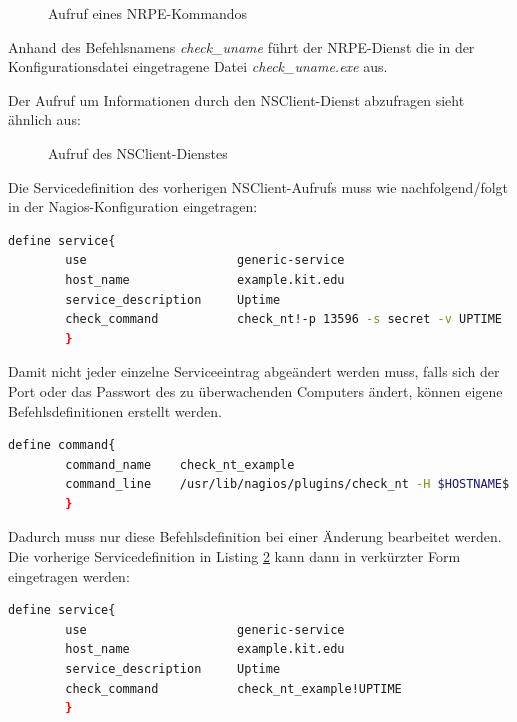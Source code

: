 \begin{figure}[ht]
	\centering
		\caption{Aufruf eines NRPE-Kommandos}
		\label{nrpecheck}
\end{figure}



Anhand des Befehlsnamens \textit{check\_uname} führt der \gls{NRPE}-Dienst die in der Konfigurationsdatei eingetragene Datei \textit{check\_uname.exe} aus.

Der Aufruf um Informationen durch den NSClient-Dienst abzufragen sieht ähnlich aus:

\begin{figure}[ht]
	\centering
		\caption{Aufruf des NSClient-Dienstes}
		\label{ntcheck}
\end{figure}

Die Servicedefinition des vorherigen NSClient-Aufrufs muss wie nachfolgend/folgt in der Nagios-Konfiguration eingetragen:
\begin{lstlisting}[captionpos=b, caption=Servicedefinition des NSClient-Checks, label=nt-servdef, breaklines = true, language=sh]
define service{
        use                     generic-service
        host_name               example.kit.edu
        service_description     Uptime
        check_command           check_nt!-p 13596 -s secret -v UPTIME
        }
\end{lstlisting}

Damit nicht jeder einzelne Serviceeintrag abgeändert werden muss, falls sich der Port oder das Passwort des zu überwachenden Computers ändert, können eigene Befehlsdefinitionen erstellt werden.

\begin{lstlisting}[captionpos=b, caption=Server spezifische Befehlsdefinition, label=cus-nt-servdef, breaklines = true, language=sh]        
define command{
        command_name    check_nt_example
        command_line    /usr/lib/nagios/plugins/check_nt -H $HOSTNAME$ -p 13597 -p secret -v $ARG1$
        }
\end{lstlisting}

Dadurch muss nur diese Befehlsdefinition bei einer Änderung bearbeitet werden.
Die vorherige Servicedefinition in Listing \ref{ntcheck} kann dann in verkürzter Form eingetragen werden:

\begin{lstlisting}[captionpos=b, caption=Verkürzte Servicedefinition des NSClient-Checks, label=nt-servdef, breaklines = true, language=sh]
define service{
        use                     generic-service
        host_name               example.kit.edu
        service_description     Uptime
        check_command           check_nt_example!UPTIME
        }
\end{lstlisting}


